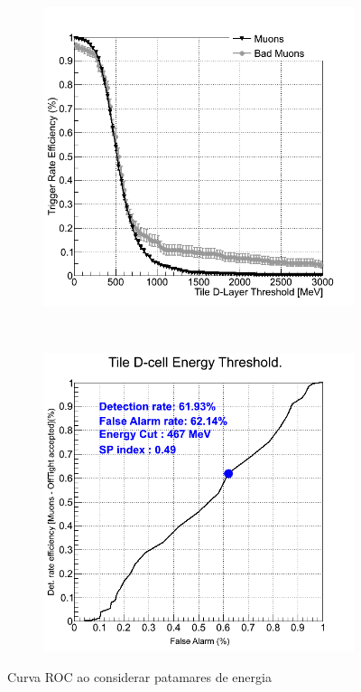 \begin{figure}[htpb!]
        \centering
        \begin{subfigure}[b]{0.45\textwidth}
                \centering
                \includegraphics[width=\textwidth]{images/minbias/C.png}
        \end{subfigure}%
        ~
        \begin{subfigure}[b]{0.45\textwidth}
                \centering
                \includegraphics[width=\textwidth]{images/minbias/C_roc.png}
        \end{subfigure}
        \caption{Curva ROC ao considerar patamares de energia}
        \label{fig:ROCEnergyminbias}
\end{figure}

